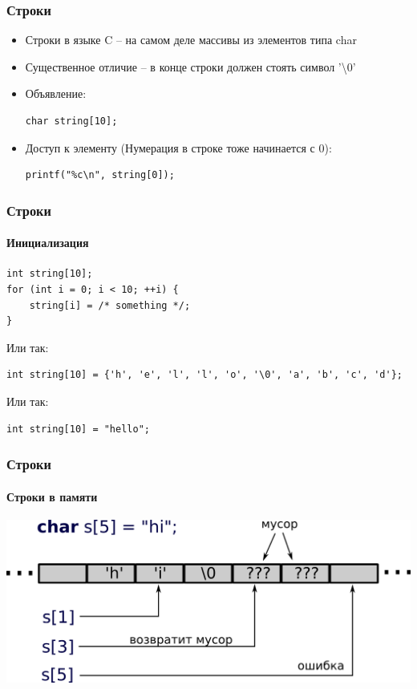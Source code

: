 \documentclass[14pt,pdf,hyperref={unicode}]{beamer}
\begin{document}
\begin{frame}[fragile]
\frametitle{Строки} 
\begin{itemize}
\item Строки в языке C -- на самом деле массивы из элементов типа char
\item Существенное отличие -- в конце строки должен стоять символ '\textbackslash 0'
\item Объявление:
\begin{lstlisting}
char string[10];
\end{lstlisting}
\item Доступ к элементу
(Нумерация в строке тоже начинается с 0):\\
\begin{lstlisting}
printf("%c\n", string[0]);
\end{lstlisting}
\end{itemize}
\end{frame}


\begin{frame}[fragile]
\frametitle{Строки} 
\framesubtitle{Инициализация}
\begin{lstlisting}
int string[10];
for (int i = 0; i < 10; ++i) {
    string[i] = /* something */;
}
\end{lstlisting}
Или так:\\
\begin{lstlisting}
int string[10] = {'h', 'e', 'l', 'l', 'o', '\0', 'a', 'b', 'c', 'd'};
\end{lstlisting}
Или так:\\
\begin{lstlisting}
int string[10] = "hello";
\end{lstlisting}
\end{frame}

\begin{frame}[fragile]
\frametitle{Строки} 
\framesubtitle{Строки в памяти}
\begin{center}
\includegraphics[width=0.95\linewidth]{images/string_in_memory.png}
\end{center}
\end{frame}
\end{document}
